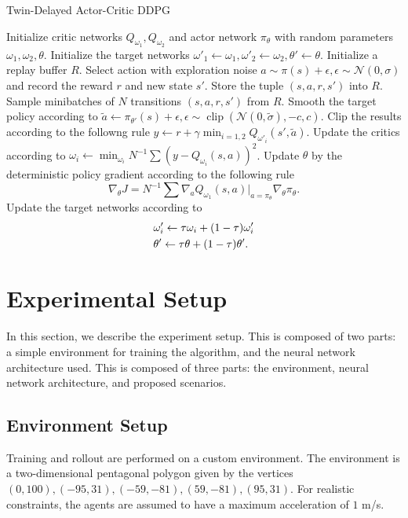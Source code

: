 \documentclass[10pt,conference]{IEEEtran}
\DeclareMathOperator{\Clip}{clip}
\begin{document}
\begin{algorithm}
	\caption{Twin-Delayed Actor-Critic DDPG}
	\begin{algorithmic}[2]
		\STATE Initialize critic networks $Q_{\omega_1}, Q_{\omega_2}$ and actor network $\pi_{\theta}$ with random parameters
		$\omega_1, \omega_2, \theta$. 
		\STATE Initialize the target networks $\omega'_1 \leftarrow \omega_1, \omega'_2 \leftarrow \omega_2, \theta' \leftarrow \theta$.
		\STATE Initialize a replay buffer $R$.
			\STATE Select action with exploration noise $a \sim \pi(s) + \epsilon, \epsilon \sim \mathcal{N}(0, \sigma)$ and record the reward $r$ and new state $s'$. 
			\STATE Store the tuple $(s, a, r, s')$ into $R$. 
			\STATE Sample minibatches of $N$ transitions $(s, a, r, s')$ from $R$.
			\STATE Smooth the target policy according to $\tilde{a} \leftarrow \pi_{\theta'}(s) + \epsilon, \epsilon \sim \Clip(\mathcal{N}(0, \tilde{\sigma}), -c, c)$.
			\STATE Clip the results according to the followng rule $y \leftarrow r + \gamma \min_{i=1,2}Q_{\omega'_i}(s', \tilde{a})$. 
			\STATE Update the critics according to $\omega_i \leftarrow \min_{\omega_i}N^{-1}\sum(y - Q_{\omega_i}(s, a))^2$.
				\STATE Update $\theta$ by the deterministic policy gradient according to the following rule 
				\begin{equation*}
					\displaystyle \nabla_{\theta}J = N^{-1}\sum\nabla_a Q_{\omega_1}(s,a)\big|_{a = \pi_{\theta}}\nabla_{\theta}\pi_{\theta}.
				\end{equation*}
				\STATE Update the target networks according to 
				\begin{align*}
					\displaystyle &\omega'_i \leftarrow \tau\omega_i + (1-\tau)\omega'_i \\
					&\theta' \leftarrow \tau\theta + (1-\tau)\theta'.
				\end{align*}
			\ENDIF 
		\ENDFOR
	\end{algorithmic}
	\label{sacddpg}	
\end{algorithm}
\section{Experimental Setup}
In this section, we describe the experiment setup. This is composed of two parts: a simple environment for training the algorithm, and the neural network architecture used. This is composed of three parts: the environment, neural network architecture, and proposed scenarios. 
\subsection{Environment Setup}
Training and rollout are performed on a custom environment. The environment is a two-dimensional pentagonal polygon given by the vertices $(0,100), (-95,31), (-59,-81), (59,-81), (95,31)$. For realistic constraints, the agents are assumed to have a maximum acceleration of $1$ m/s. 
\end{document}
